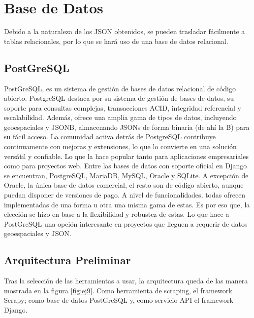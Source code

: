 \section{Base de Datos}
Debido a la naturaleza de los JSON obtenidos, se pueden trasladar fácilmente a tablas relacionales, por lo que se hará uso de una base de datos relacional.

\subsection{PostGreSQL}
PostGreSQL, es un sistema de gestión de bases de datos relacional de código abierto. PostgreSQL destaca por su sistema de gestión de bases de datos, su soporte para consultas complejas, transacciones ACID, integridad referencial y escalabilidad.\newline
\newline
Además, ofrece una amplia gama de tipos de datos, incluyendo geoespaciales y JSONB, almacenando JSONs de forma binaria (de ahí la B) para su fácil acceso.\newline
\newline
La comunidad activa detrás de PostgreSQL contribuye continuamente con mejoras y extensiones, lo que lo convierte en una solución versátil y confiable. Lo que la hace popular tanto para aplicaciones empresariales como para proyectos web.\newline
\newline
Entre las bases de datos con soporte oficial en Django se encuentran, PostgreSQL, MariaDB, MySQL, Oracle y SQLite. A excepción de Oracle, la única base de datos comercial, el resto son de código abierto, aunque puedan disponer de versiones de pago.\newline
\newline
A nivel de funcionalidades, todas ofrecen implementadas de una forma u otra una misma gama de estas. Es por eso que, la elección se hizo en base a la flexibilidad y robustez de estas. Lo que hace a PostGreSQL una opción interesante en proyectos que lleguen a requerir de datos geoespaciales y JSON.

\subsection{Arquitectura Preliminar}
Tras la selección de las herramientas a usar, la arquitectura queda de las manera mostrada en la figura \ref{fig:ej9}. Como herramienta de scraping, el framework Scrapy; como base de datos PostGreSQL y, como servicio API el framework Django.

